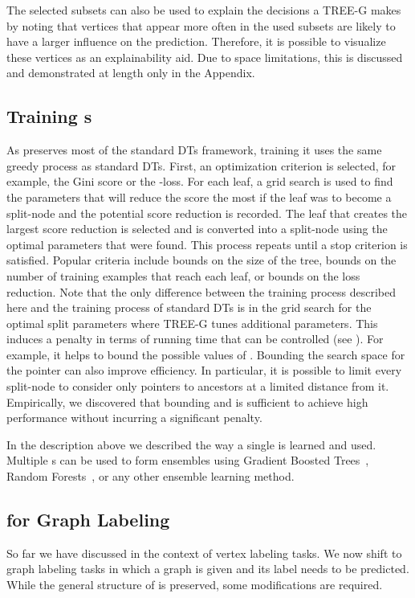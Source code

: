 The selected subsets can also be used to explain the decisions a TREE-G makes by noting that vertices that appear more often in the used subsets are likely to have a larger influence on the prediction. Therefore, it is possible to visualize these vertices as an explainability aid. Due to space limitations, this is discussed and demonstrated at length only in the Appendix.


\subsection{Training \acronym{}s}\label{sec:training}
As \acronym preserves most of the standard DTs framework, training it uses the same greedy process as standard DTs. First, an optimization criterion is selected, for example, the Gini score or the -loss. For each leaf, a grid search is used to find the parameters that will reduce the score the most if the leaf was to become a split-node and the potential score reduction is recorded. The leaf that creates the largest score reduction is selected and is converted into a split-node using the optimal parameters that were found. This process repeats until a stop criterion is satisfied. Popular criteria include bounds on the size of the tree, bounds on the number of training examples that reach each leaf, or bounds on the loss reduction. Note that the only difference between the training process described here and the training process of standard DTs is in the grid search for the optimal split parameters where TREE-G tunes additional parameters. This induces a penalty in terms of running time that can be controlled (see ).
For example, it helps to bound the possible values of . Bounding the search space for the pointer  can also improve efficiency.
In particular, it is possible to limit every split-node to consider only pointers to ancestors at a limited distance  from it.
Empirically, we discovered that bounding  and 
is sufficient to achieve high performance without incurring a significant penalty.

In the description above we described the way a single \acronym is learned and used. Multiple \acronym{}s can be used to form ensembles using Gradient Boosted Trees~\cite{gbt}, Random Forests~\cite{rf}, or any other ensemble learning method.


\subsection{\acronym for Graph Labeling}\label{subsection:graph_level_tasks}
So far we have discussed \acronym in the context of vertex labeling tasks. 
We now shift to graph labeling tasks in which a graph is given and its label needs to be predicted. While the general structure of \acronym is preserved, some modifications are required.


